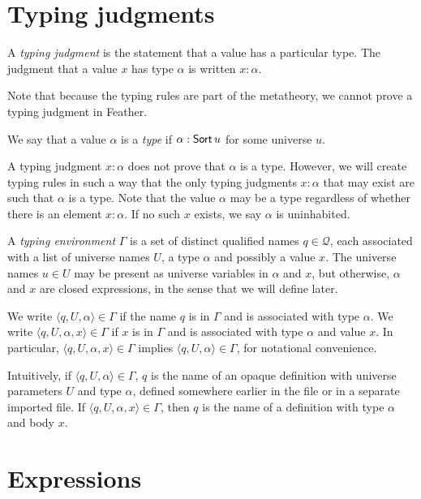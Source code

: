 \section{Typing judgments}
\begin{defn}
	A \textit{typing judgment} is the statement that a value has a particular type.
	The judgment that a value \( x \) has type \( \alpha \) is written \( x : \alpha \).
\end{defn}
Note that because the typing rules are part of the metatheory, we cannot prove a typing judgment in Feather.
\begin{defn}
	We say that a value \( \alpha \) is a \textit{type} if \( \alpha : \operatorname{\mathsf{Sort}} u \) for some universe \( u \).
\end{defn}
A typing judgment \( x : \alpha \) does not prove that \( \alpha \) is a type.
However, we will create typing rules in such a way that the only typing judgments \( x : \alpha \) that may exist are such that \( \alpha \) is a type.
Note that the value \( \alpha \) may be a type regardless of whether there is an element \( x : \alpha \).
If no such \( x \) exists, we say \( \alpha \) is uninhabited.
\begin{defn}
	A \textit{typing environment} \( \Gamma \) is a set of distinct qualified names \( q \in \mathcal Q \), each associated with a list of universe names \( U \), a type \( \alpha \) and possibly a value \( x \).
	The universe names \( u \in U \) may be present as universe variables in \( \alpha \) and \( x \), but otherwise, \( \alpha \) and \( x \) are closed expressions, in the sense that we will define later.

	We write \( \langle q, U, \alpha \rangle \in \Gamma \) if the name \( q \) is in \( \Gamma \) and is associated with type \( \alpha \).
	We write \( \langle q, U, \alpha, x \rangle \in \Gamma \) if \( x \) is in \( \Gamma \) and is associated with type \( \alpha \) and value \( x \).
	In particular, \( \langle q, U, \alpha, x \rangle \in \Gamma \) implies \( \langle q, U, \alpha \rangle \in \Gamma \), for notational convenience.
\end{defn}
Intuitively, if \( \langle q, U, \alpha \rangle \in \Gamma \), \( q \) is the name of an opaque definition with universe parameters \( U \) and type \( \alpha \), defined somewhere earlier in the file or in a separate imported file.
If \( \langle q, U, \alpha, x \rangle \in \Gamma \), then \( q \) is the name of a definition with type \( \alpha \) and body \( x \).

\section{Expressions}
